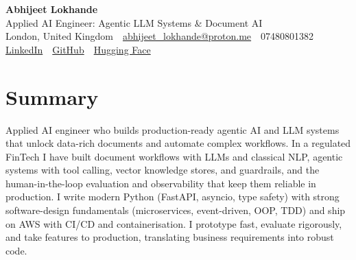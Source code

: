 \documentclass[10pt,a4paper]{article}
\newcommand{\sep}{\,\textcolor{accent!60}{\textbar}\,}
\begin{document}
\begin{center}
  {\fontsize{24}{26}\selectfont\bfseries Abhijeet Lokhande}\\[3pt]
  {\color{accent}\large Applied AI Engineer: Agentic LLM Systems \& Document AI}\\[5pt]
  {\small
    London, United Kingdom \sep
    \href{mailto:abhijeet_lokhande@proton.me}{abhijeet\_lokhande@proton.me} \sep
    07480801382 \\[2pt]
    \href{https://www.linkedin.com/in/ablds/}{LinkedIn} \sep
    \href{https://github.com/abhijeetscode}{GitHub} \sep
    \href{https://huggingface.co/ab-ai}{Hugging Face}
  }
\end{center}
\vspace{2pt}

\section{Summary}
Applied AI engineer who builds production-ready agentic AI and LLM systems that unlock data-rich documents and automate complex workflows. In a regulated FinTech I have built document workflows with LLMs and classical NLP, agentic systems with tool calling, vector knowledge stores, and guardrails, and the human-in-the-loop evaluation and observability that keep them reliable in production. I write modern Python (FastAPI, asyncio, type safety) with strong software-design fundamentals (microservices, event-driven, OOP, TDD) and ship on AWS with CI/CD and containerisation. I prototype fast, evaluate rigorously, and take features to production, translating business requirements into robust code.

\end{document}

